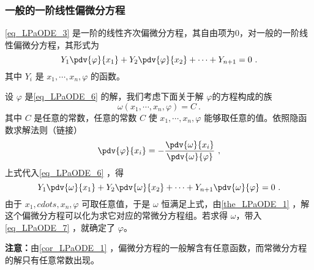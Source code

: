 \subsubsection{一般的一阶线性偏微分方程}
\autoref{eq_LPaODE_3} 是一阶的线性齐次偏微分方程，其自由项为0，对一般的一阶线性偏微分方程，其形式为
\begin{equation}\label{eq_LPaODE_6}
Y_1\pdv{\varphi}{x_1}+Y_2\pdv{\varphi}{x_2}+\cdots+Y_{n+1}=0~.
\end{equation}
其中 $Y_i$ 是 $x_1,\cdots,x_n,\varphi$ 的函数。

设 $\varphi$ 是\autoref{eq_LPaODE_6} 的解，我们考虑下面关于解 $\varphi$的方程构成的族
\begin{equation}\label{eq_LPaODE_7}
\omega(x_1,\cdots,x_n,\varphi)=C~.
\end{equation}
其中 $C$ 是任意的常数，任意的常数 $C$ 使 $x_1,\cdots,x_n,\varphi$ 能够取任意的值。依照隐函数求解法则（链接）
\begin{equation}
\pdv{\varphi}{x_i}=-\frac{\pdv{\omega}{x_i}}{\pdv{\omega}{\varphi}}~,
\end{equation}
上式代入\autoref{eq_LPaODE_6} ，得
\begin{equation}
Y_1\pdv{\omega}{x_1}+Y_2\pdv{\omega}{x_2}+\cdots+Y_{n+1}\pdv{\omega}{\varphi}=0~.
\end{equation}
由于 $x_1,cdots,x_n,\varphi$ 可取任意值，于是 $\omega$ 恒满足上式，由\autoref{the_LPaODE_1} ，解这个偏微分方程可以化为求它对应的常微分方程组。若求得 $\omega$，带入\autoref{eq_LPaODE_7} ，就确定了 $\varphi$。

\textbf{注意：}由\autoref{cor_LPaODE_1} ，偏微分方程的一般解含有任意函数，而常微分方程的解只有任意常数出现。
